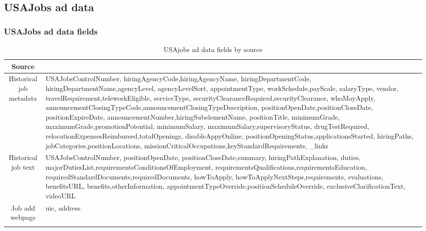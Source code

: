 \documentclass[12pt]{article}
\begin{document}
\newpage

\subsection{USAJobs ad data}

\subsubsection{USAJobs ad data fields}

\begin{table}[ht!]
    \centering
    \vspace*{4mm}
    \begin{tabular}{c | >{\RaggedRight} m{10cm}} 
        \Xhline{3\arrayrulewidth}
            Source & \multicolumn{1}{>{\centering}p{10cm}}{Data fields} \\ \hline\hline
            Historical job metadata &  USAJobsControlNumber, hiringAgencyCode,hiringAgencyName, hiringDepartmentCode, hiringDepartmentName,agencyLevel, agencyLevelSort, appointmentType, workSchedule,payScale, salaryType, vendor, travelRequirement,teleworkEligible, serviceType, securityClearanceRequired,securityClearance, whoMayApply, announcementClosingTypeCode,announcementClosingTypeDescription, positionOpenDate,positionCloseDate, positionExpireDate, announcementNumber,hiringSubelementName, positionTitle, minimumGrade, maximumGrade,promotionPotential, minimumSalary, maximumSalary,supervisoryStatus, drugTestRequired, relocationExpensesReimbursed,totalOpenings, disableAppyOnline, positionOpeningStatus,applicationsStarted, hiringPaths, jobCategories,positionLocations, missionCriticalOccupations,keyStandardRequirements, \_links \\\hline
            Historical job text & USAJobsControlNumber, positionOpenDate, positionCloseDate,summary, hiringPathExplanation, duties, majorDutiesList,requirementsConditionsOfEmployment, requirementsQualifications,requirementsEducation, requiredStandardDocuments,requiredDocuments, howToApply, howToApplyNextSteps,requirements, evaluations, benefitsURL, benefits,otherInformation, appointmentTypeOverride,positionScheduleOverride, exclusiveClarificationText, videoURL \\\hline
            Job add webpage & uic, address \\
        \Xhline{3\arrayrulewidth}
    \end{tabular}
    \caption{USAjobs ad data fields by source}\label{tab:job_fields}
\end{table}
  
\end{document}
